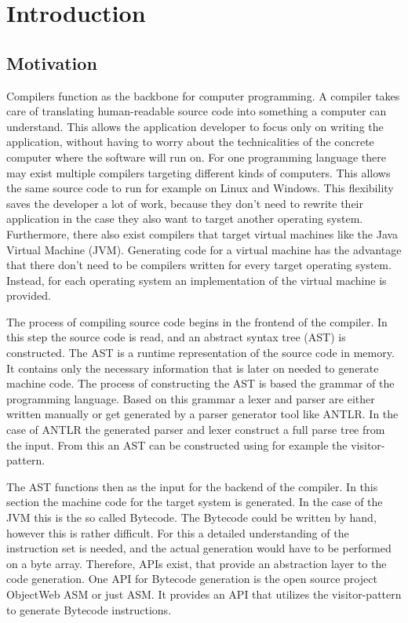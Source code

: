 \chapter{Introduction}
\label{cha:introduction}

\section{Motivation}

Compilers function as the backbone for computer programming. A compiler takes care of translating human-readable source code into something a computer can understand. This allows the application developer to focus only on writing the application, without having to worry about the technicalities of the concrete computer where the software will run on. For one programming language there may exist multiple compilers targeting different kinds of computers. This allows the same source code to run for example on Linux and Windows. This flexibility saves the developer a lot of work, because they don't need to rewrite their application in the case they also want to target another operating system. Furthermore, there also exist compilers that target virtual machines like the Java Virtual Machine (JVM). Generating code for a virtual machine has the advantage that there don't need to be compilers written for every target operating system. Instead, for each operating system an implementation of the virtual machine is provided.

The process of compiling source code begins in the frontend of the compiler. In this step the source code is read, and an abstract syntax tree (AST) is constructed. The AST is a runtime representation of the source code in memory. It contains only the necessary information that is later on needed to generate machine code. The process of constructing the AST is based the grammar of the programming language. Based on this grammar a lexer and parser are either written manually or get generated by a parser generator tool like ANTLR. In the case of ANTLR the generated parser and lexer construct a full parse tree from the input. From this an AST can be constructed using for example the visitor-pattern. 

The AST functions then as the input for the backend of the compiler. In this section the machine code for the target system is generated. In the case of the JVM this is the so called Bytecode. The Bytecode could be written by hand, however this is rather difficult. For this a detailed understanding of the instruction set is needed, and the actual generation would have to be performed on a byte array. Therefore, APIs exist, that provide an abstraction layer to the code generation. One API for Bytecode generation is the open source project ObjectWeb ASM or just ASM. It provides an API that utilizes the visitor-pattern to generate Bytecode instructions. 
